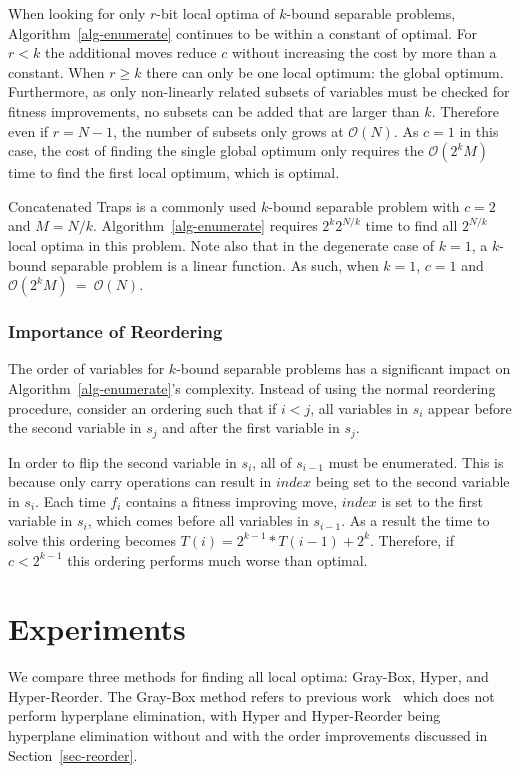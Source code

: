 \documentclass[runningheads,a4paper]{llncs}
\newcommand{\BigO}[1]{$\mathcal{O}{(#1)}$}
\begin{document}
When looking for only $r$-bit local optima of $k$-bound separable problems,
Algorithm~\ref{alg-enumerate} continues to be within a constant of optimal.
For $r < k$ the additional moves reduce $c$ without increasing the cost
by more than a constant.
When $r \geq k$ there can only be one local optimum: the global optimum. Furthermore, as
only non-linearly related subsets of variables must be checked
for fitness improvements, no subsets can be added that are larger than $k$.
Therefore even if $r=N-1$, the number of subsets only grows at \BigO{N}.
As $c=1$ in this case, the cost of finding the single global optimum
only requires the \BigO{2^kM} time to find the first local optimum, which is
optimal.

Concatenated Traps is a commonly used $k$-bound separable problem
with $c=2$ and $M=N/k$.  Algorithm~\ref{alg-enumerate} requires $2^k2^{N/k}$ time
to find all $2^{N/k}$ local optima in this problem. Note also that
in the degenerate case of $k=1$, a $k$-bound separable problem
is a linear function. As such, when $k=1$, $c=1$ and
\BigO{2^kM}~=~\BigO{N}.

\subsubsection{Importance of Reordering}
The order of variables for $k$-bound separable problems
has a significant impact on Algorithm~\ref{alg-enumerate}'s complexity.
Instead of using the normal reordering procedure, consider an ordering
such that if $i < j$, all variables in $s_i$ appear before the second variable
in $s_j$ and after the first variable in $s_j$.

In order to flip the second variable in $s_i$, all of $s_{i-1}$ must be enumerated.
This is because only carry operations can result in $index$ being set to the second
variable in $s_i$. Each time $f_i$ contains a fitness improving move, $index$ is set
to the first variable in $s_i$, which comes before all variables in $s_{i-1}$.
As a result the time to solve this ordering becomes $T(i) = 2^{k-1}*T(i-1)+2^k$.
Therefore, if $c < 2^{k-1}$ this ordering performs much worse than optimal.

\section{Experiments}
We compare three methods for finding all local optima: Gray-Box, Hyper, and Hyper-Reorder.
The Gray-Box method refers to previous work~\cite{ochoa:2015:crossovernetworks} which does
not perform hyperplane elimination, with Hyper and Hyper-Reorder being hyperplane elimination
without and with the order improvements discussed in Section~\ref{sec-reorder}.
\end{document}
